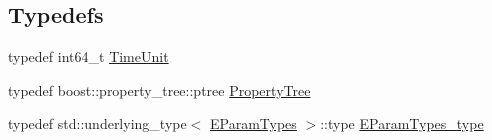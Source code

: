 \subsection*{Typedefs}
\begin{DoxyCompactItemize}
\item 
typedef int64\+\_\+t \hyperlink{namespacesolar__core_a4b5949d07259da6f8a20d12a30403e90}{Time\+Unit}
\item 
typedef boost\+::property\+\_\+tree\+::ptree \hyperlink{namespacesolar__core_adeda2737d6938c190eb774a5b2495045}{Property\+Tree}
\item 
typedef std\+::underlying\+\_\+type$<$ \hyperlink{namespacesolar__core_aa1147341e5ef7a40d68d1bd68e149362}{E\+Param\+Types} $>$\+::type \hyperlink{namespacesolar__core_a256e8e2dc052f522b522d3f90b294caf}{E\+Param\+Types\+\_\+type}
\end{DoxyCompactItemize}
